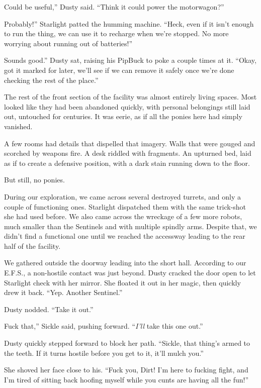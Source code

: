\leavevmode{}Could be useful,” Dusty said. “Think it could power the motorwagon?”

\leavevmode{}Probably!” Starlight patted the humming machine. “Heck, even if it isn’t enough to run the thing, we can use it to recharge when we’re stopped. No more worrying about running out of batteries!”

\leavevmode{}Sounds good.” Dusty sat, raising his PipBuck to poke a couple times at it. “Okay, got it marked for later, we’ll see if we can remove it safely once we’re done checking the rest of the place.”

The rest of the front section of the facility was almost entirely living spaces. Most looked like they had been abandoned quickly, with personal belongings still laid out, untouched for centuries. It was eerie, as if all the ponies here had simply vanished.

A few rooms had details that dispelled that imagery. Walls that were gouged and scorched by weapons fire. A desk riddled with fragments. An upturned bed, laid as if to create a defensive position, with a dark stain running down to the floor.

But still, no ponies.

During our exploration, we came across several destroyed turrets, and only a couple of functioning ones. Starlight dispatched them with the same trick-shot she had used before. We also came across the wreckage of a few more robots, much smaller than the Sentinels and with multiple spindly arms. Despite that, we didn’t find a functional one until we reached the accessway leading to the rear half of the facility.

We gathered outside the doorway leading into the short hall. According to our E.F.S., a non-hostile contact was just beyond. Dusty cracked the door open to let Starlight check with her mirror. She floated it out in her magic, then quickly drew it back. “Yep. Another Sentinel.”

Dusty nodded. “Take it out.”

\leavevmode{}Fuck that,” Sickle said, pushing forward. “\textit{I’ll} take this one out.”

Dusty quickly stepped forward to block her path. “Sickle, that thing’s armed to the teeth. If it turns hostile before you get to it, it’ll mulch you.”

She shoved her face close to his. “Fuck you, Dirt! I’m here to fucking fight, and I’m tired of sitting back hoofing myself while you cunts are having all the fun!”

